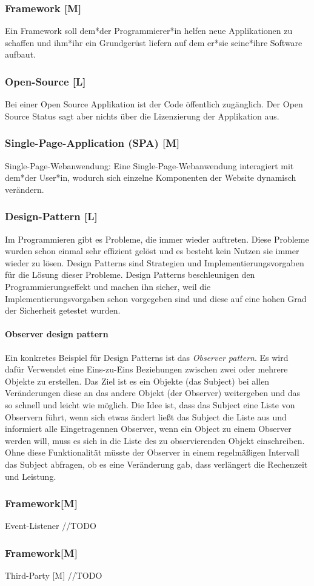 \subsubsection{Framework [M]}

Ein Framework soll dem*der Programmierer*in helfen neue Applikationen zu schaffen und ihm*ihr ein Grundgerüst liefern auf dem er*sie seine*ihre Software aufbaut.  

\subsubsection{Open-Source [L]}
Bei einer Open Source Applikation ist der Code öffentlich zugänglich. Der Open Source Status sagt aber nichts über die Lizenzierung der Applikation aus. 

\subsubsection{Single-Page-Application (SPA) [M]}
Single-Page-Webanwendung: 
Eine Single-Page-Webanwendung interagiert mit dem*der User*in, wodurch sich einzelne Komponenten der Website dynamisch verändern.

\subsubsection{Design-Pattern [L]}
Im Programmieren gibt es Probleme, die immer wieder auftreten. Diese Probleme wurden schon einmal sehr effizient gelöst und es besteht kein Nutzen sie immer wieder zu lösen. Design Patterns sind Strategien und Implementierungsvorgaben für die Lösung dieser Probleme. Design Patterns beschleunigen den Programmierungseffekt und machen ihn sicher, weil die Implementierungsvorgaben schon vorgegeben sind und diese auf eine hohen Grad der Sicherheit getestet wurden. \cite{DesignPatterns}

\paragraph{Observer design pattern}
Ein konkretes Beispiel für Design Patterns ist das \emph{Observer pattern}. Es wird dafür Verwendet eine Eins-zu-Eins Beziehungen zwischen zwei oder mehrere Objekte zu erstellen. Das Ziel ist es ein Objekte (das Subject) bei allen Veränderungen diese an das andere Objekt (der Observer) weitergeben und das so schnell und leicht wie möglich. Die Idee ist, dass das Subject eine Liste von Observern führt, wenn sich etwas ändert ließt das Subject die Liste aus und informiert alle Eingetragennen Observer, wenn ein Object zu einem Observer werden will, muss es sich in die Liste des zu observierenden Objekt einschreiben. Ohne diese Funktionalität müsste der Observer in einem regelmäßigen Intervall das Subject abfragen, ob es eine Veränderung gab, dass verlängert die Rechenzeit und Leistung. \cite{ObserverPatternExplaination}

\subsubsection{Framework[M]}
Event-Listener
//TODO

\subsubsection{Framework[M]}
Third-Party [M]
//TODO
